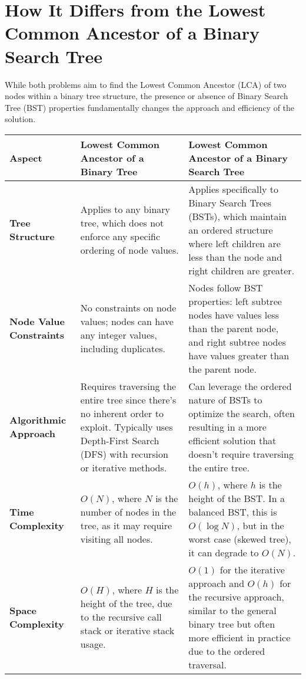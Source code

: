 \section*{How It Differs from the Lowest Common Ancestor of a Binary Search Tree}

While both problems aim to find the Lowest Common Ancestor (LCA) of two nodes within a binary tree structure, the presence or absence of Binary Search Tree (BST) properties fundamentally changes the approach and efficiency of the solution.

\begin{center}
\begin{tabular}{|l|p{6cm}|p{6cm}|}
\hline
\textbf{Aspect} & \textbf{Lowest Common Ancestor of a Binary Tree} & \textbf{Lowest Common Ancestor of a Binary Search Tree} \\
\hline
\textbf{Tree Structure} & Applies to any binary tree, which does not enforce any specific ordering of node values. & Applies specifically to Binary Search Trees (BSTs), which maintain an ordered structure where left children are less than the node and right children are greater. \\
\hline
\textbf{Node Value Constraints} & No constraints on node values; nodes can have any integer values, including duplicates. & Nodes follow BST properties: left subtree nodes have values less than the parent node, and right subtree nodes have values greater than the parent node. \\
\hline
\textbf{Algorithmic Approach} & Requires traversing the entire tree since there's no inherent order to exploit. Typically uses Depth-First Search (DFS) with recursion or iterative methods. & Can leverage the ordered nature of BSTs to optimize the search, often resulting in a more efficient solution that doesn't require traversing the entire tree. \\
\hline
\textbf{Time Complexity} & \(O(N)\), where \(N\) is the number of nodes in the tree, as it may require visiting all nodes. & \(O(h)\), where \(h\) is the height of the BST. In a balanced BST, this is \(O(\log N)\), but in the worst case (skewed tree), it can degrade to \(O(N)\). \\
\hline
\textbf{Space Complexity} & \(O(H)\), where \(H\) is the height of the tree, due to the recursive call stack or iterative stack usage. & \(O(1)\) for the iterative approach and \(O(h)\) for the recursive approach, similar to the general binary tree but often more efficient in practice due to the ordered traversal. \\
\hline
\end{tabular}
\end{center}
